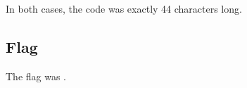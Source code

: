 		In both cases, the code was exactly \num{44} characters long.


	\subsection{Flag}

		The flag was .

















